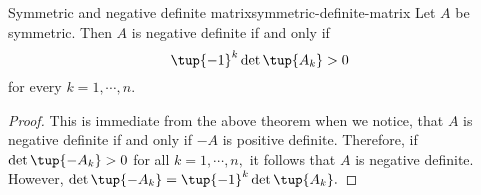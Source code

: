 \begin{corollary}{Symmetric and negative definite matrix}{symmetric-definite-matrix} %
Let $A$ be symmetric. Then $A$ is negative definite if and only
if 
\begin{equation*}
\tup{-1} ^{k} \det \tup{A_{k}} >0
\end{equation*}
for every $k=1,\cdots ,n$.
\end{corollary}

\begin{proof}This is immediate from the above theorem when we notice,
that $A$ is negative definite if and only if $-A$ is positive definite.
Therefore, if $\det \tup{-A_{k}} >0$ for all $k=1,\cdots ,n,$ it
follows that $A$ is negative definite. However, $\det \tup{-A_{k}}
=\tup{-1} ^{k}\det \tup{A_{k}} .$ 
\end{proof}